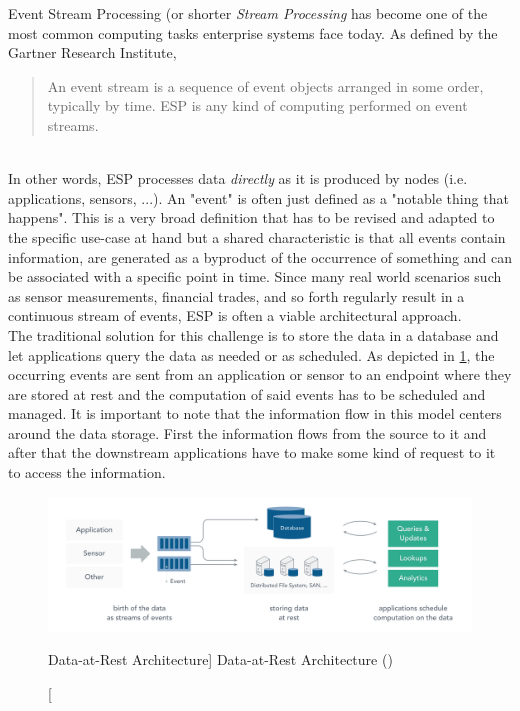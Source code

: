 Event Stream Processing (or shorter \textit{Stream Processing} has become one of the most common computing tasks enterprise systems face today. As defined by the Gartner Research Institute,
\blockquote{An event stream is a sequence of event objects arranged in some order, typically by time. \acf{ESP} is any kind of computing performed on event streams.}\autocite{Schulte2017TechnologyProcessing}\\
In other words, \acf{ESP} processes data \textit{directly} as it is produced by nodes (i.e. applications, sensors, ...). An "event" is often just defined as a "notable thing that happens".\autocite{Michelson2011Event-DrivenOverview} This is a very broad definition that has to be revised and adapted to the specific use-case at hand but a shared characteristic is that all events contain information, are generated as a byproduct of the occurrence of something and can be associated with a specific point in time. 
Since many real world scenarios such as sensor measurements, financial trades, and so forth regularly result in a continuous stream of events, \acf{ESP} is often a viable architectural approach.\\
The traditional solution for this challenge is to store the data in a database and let applications query the data as needed or as scheduled. As depicted in \ref{fig:dataRest}, the occurring events are sent from an application or sensor to an endpoint where they are stored at rest and the computation of said events has to be scheduled and managed. It is important to note that the information flow in this model centers around the data storage. First the information flows from the source to it and after that the downstream applications have to make some kind of request to it to access the information.

\begin{figure}[ht]
    \includegraphics[width=\linewidth]{images/streaming/data_at_rest.png}\centering
    \caption
    [Data-at-Rest Architecture]
    {Data-at-Rest Architecture (\cite{dataArtisans2017WhatProcessing})}
    \label{fig:dataRest}
\end{figure}

